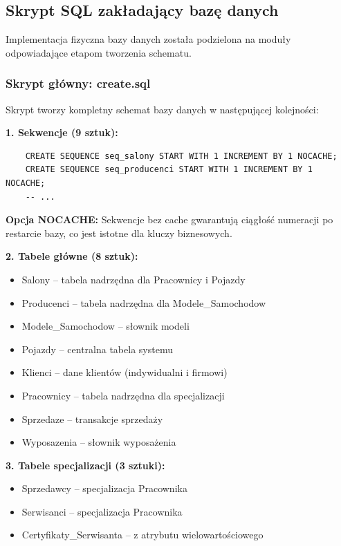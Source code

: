 \documentclass[a4paper,titleauthor]{mwart}
\begin{document}
	\subsection{Skrypt SQL zakładający bazę danych}

	Implementacja fizyczna bazy danych została podzielona na moduły odpowiadające etapom tworzenia schematu.

	\subsubsection{Skrypt główny: create.sql}

	Skrypt tworzy kompletny schemat bazy danych w następującej kolejności:

	\textbf{1. Sekwencje (9 sztuk):}
	\begin{verbatim}
	CREATE SEQUENCE seq_salony START WITH 1 INCREMENT BY 1 NOCACHE;
	CREATE SEQUENCE seq_producenci START WITH 1 INCREMENT BY 1 NOCACHE;
	-- ...
	\end{verbatim}

	\textbf{Opcja NOCACHE:} Sekwencje bez cache gwarantują ciągłość numeracji po restarcie bazy, co jest istotne dla kluczy biznesowych.

	\textbf{2. Tabele główne (8 sztuk):}
	\begin{itemize}
		\item Salony -- tabela nadrzędna dla Pracownicy i Pojazdy
		\item Producenci -- tabela nadrzędna dla Modele\_Samochodow
		\item Modele\_Samochodow -- słownik modeli
		\item Pojazdy -- centralna tabela systemu
		\item Klienci -- dane klientów (indywidualni i firmowi)
		\item Pracownicy -- tabela nadrzędna dla specjalizacji
		\item Sprzedaze -- transakcje sprzedaży
		\item Wyposazenia -- słownik wyposażenia
	\end{itemize}

	\textbf{3. Tabele specjalizacji (3 sztuki):}
	\begin{itemize}
		\item Sprzedawcy -- specjalizacja Pracownika
		\item Serwisanci -- specjalizacja Pracownika
		\item Certyfikaty\_Serwisanta -- z atrybutu wielowartościowego
	\end{itemize}
\end{document}
